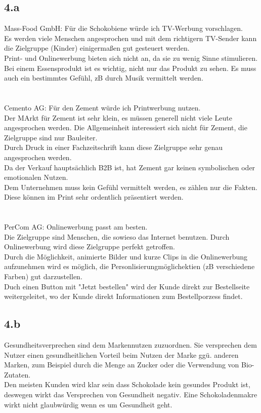 \subsection*{4.a}
    Mass-Food GmbH: Für die Schokobiene würde ich TV-Werbung vorschlagen. \\
    Es werden viele Menschen angesprochen und mit dem richtigern TV-Sender kann die Zielgruppe (Kinder) einigermaßen gut gesteuert werden. \\
    Print- und Onlinewerbung bieten sich nicht an, da sie zu wenig Sinne stimulieren. \\
    Bei einem Essensprodukt ist es wichtig, nicht nur das Produkt zu sehen. Es muss auch ein bestimmtes Gefühl, zB durch Musik vermittelt werden. \\
    \ \\
    \ \\
    Cemento AG: Für den Zement würde ich Printwerbung nutzen. \\
    Der MArkt für Zement ist sehr klein, es müssen generell nicht viele Leute angesprochen werden. Die Allgemeinheit interessiert sich nicht für Zement, die Zielgruppe sind nur Bauleiter. \\
    Durch Druck in einer Fachzeitschrift kann diese Zielgruppe sehr genau angesprochen werden. \\
    Da der Verkauf hauptsächlich B2B ist, hat Zement gar keinen symbolischen oder emotionalen Nutzen. \\
    Dem Unternehmen muss kein Gefühl vermittelt werden, es zählen nur die Fakten. Diese können im Print sehr ordentlich präsentiert werden. \\
    \ \\
    \ \\
    PerCom AG: Onlinewerbung passt am besten. \\
    Die Zielgruppe sind Menschen, die sowieso das Internet benutzen. Durch Onlinewerbung wird diese Zielgruppe perfekt getroffen. \\
    Durch die Möglichkeit, animierte Bilder und kurze Clips in die Onlinewerbung aufzunehmen wird es möglich, die Personlisierungmöglichektien (zB verschiedene Farben) gut darzustellen. \\
    Duch einen Button mit "Jetzt bestellen" wird der Kunde direkt zur Bestellseite weitergeleitet, wo der Kunde direkt Informationen zum Bestellporzess findet. \\

\subsection*{4.b}
    Gesundheitsverprechen sind dem Markennutzen zuzuordnen. Sie versprechen dem Nutzer einen gesundheitlichen Vorteil beim Nutzen der Marke ggü. anderen Marken, zum Beispiel durch die Menge an Zucker oder die Verwendung von Bio-Zutaten. \\
    Den meisten Kunden wird klar sein dass Schokolade kein gesundes Produkt ist, deswegen wirkt das Versprechen von Gesundheit negativ. Eine Schokoladenmakre wirkt nicht glaubwürdig wenn es um Gesundheit geht.